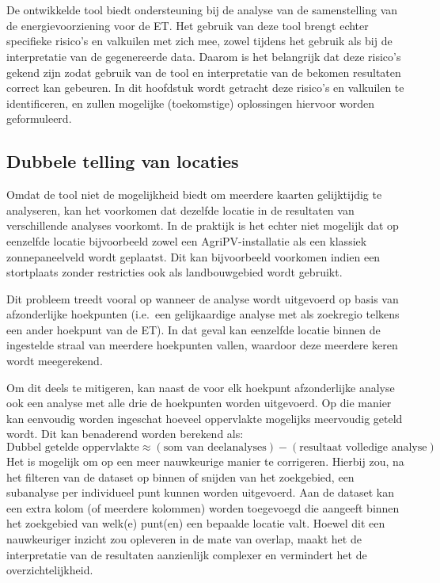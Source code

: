 
\chapter{}%
\label{ch:risicosAnalyse}

De ontwikkelde tool biedt ondersteuning bij de analyse van de samenstelling van de energievoorziening voor de ET.\@ 
Het gebruik van deze tool brengt echter specifieke risico's en valkuilen met zich mee, zowel tijdens het gebruik als bij de interpretatie van de gegenereerde data. 
Daarom is het belangrijk dat deze risico's gekend zijn zodat gebruik van de tool en interpretatie van de bekomen resultaten correct kan gebeuren. In dit hoofdstuk wordt getracht deze risico's en valkuilen te identificeren, en zullen mogelijke (toekomstige) oplossingen hiervoor worden geformuleerd.

\section{Dubbele telling van locaties}

Omdat de tool niet de mogelijkheid biedt om meerdere kaarten gelijktijdig te analyseren, kan het voorkomen dat dezelfde locatie in de resultaten van verschillende analyses voorkomt. In de praktijk is het echter niet mogelijk dat op eenzelfde locatie bijvoorbeeld zowel een AgriPV-installatie als een klassiek zonnepaneelveld wordt geplaatst. Dit kan bijvoorbeeld voorkomen indien een stortplaats zonder restricties ook als landbouwgebied wordt gebruikt.
\medskip

Dit probleem treedt vooral op wanneer de analyse wordt uitgevoerd op basis van afzonderlijke hoekpunten (i.e.\ een gelijkaardige analyse met als zoekregio telkens een ander hoekpunt van de ET). In dat geval kan eenzelfde locatie binnen de ingestelde straal van meerdere hoekpunten vallen, waardoor deze meerdere keren wordt meegerekend.

Om dit deels te mitigeren, kan naast de voor elk hoekpunt afzonderlijke analyse ook een analyse met alle drie de hoekpunten worden uitgevoerd. Op die manier kan eenvoudig worden ingeschat hoeveel oppervlakte mogelijks meervoudig geteld wordt. Dit kan benaderend worden berekend als:
\[
\text{Dubbel getelde oppervlakte} \approx (\text{som van deelanalyses}) - (\text{resultaat volledige analyse})
\]
Het is mogelijk om op een meer nauwkeurige manier te corrigeren. Hierbij zou, na het filteren van de dataset op binnen of snijden van het zoekgebied, een subanalyse per individueel punt kunnen worden uitgevoerd. Aan de dataset kan een extra kolom (of meerdere kolommen) worden toegevoegd die aangeeft binnen het zoekgebied van welk(e) punt(en) een bepaalde locatie valt.
Hoewel dit een nauwkeuriger inzicht zou opleveren in de mate van overlap, maakt het de interpretatie van de resultaten aanzienlijk complexer en vermindert het de overzichtelijkheid.

